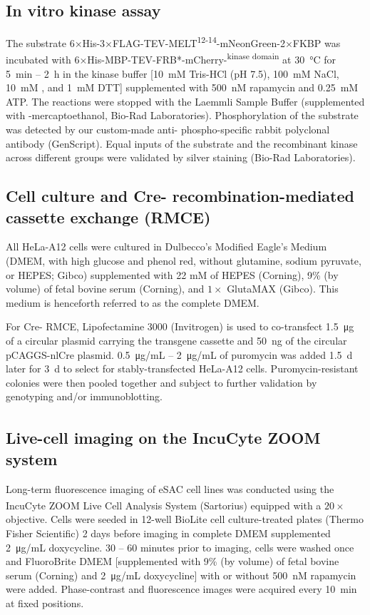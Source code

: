 \subsection{In vitro kinase assay}
The substrate 6×His-3×FLAG-TEV-MELT\textsuperscript{12-14}-mNeonGreen-2×FKBP was incubated with 6×His-MBP-TEV-FRB*-mCherry-\textsuperscript{kinase domain} at \SI{30}{\celsius} for \SI{5}{min} -- \SI{2}{h} in the kinase buffer [\SI{10}{mM} Tris-HCl (pH 7.5), \SI{100}{mM} NaCl, \SI{10}{mM} , and \SI{1}{mM} DTT] supplemented with \SI{500}{nM} rapamycin and \SI{0.25}{mM} ATP. The reactions were stopped with the Laemmli Sample Buffer (supplemented with \textbeta-mercaptoethanol, Bio-Rad Laboratories). Phosphorylation of the substrate was detected by our custom-made anti- phospho-specific rabbit polyclonal antibody (GenScript). Equal inputs of the substrate and the recombinant kinase across different groups were validated by silver staining (Bio-Rad Laboratories).

\subsection{Cell culture and Cre- recombination-mediated cassette exchange (RMCE)}
\label{CellCulture+RMCE_Methods}
All HeLa-A12 cells were cultured in Dulbecco's Modified Eagle's Medium (DMEM, with high glucose and phenol red, without glutamine, sodium pyruvate, or HEPES; Gibco) supplemented with 22 mM of HEPES (Corning), 9\% (by volume) of fetal bovine serum (Corning), and $1\times$ GlutaMAX (Gibco). This medium is henceforth referred to as the complete DMEM.

For Cre- RMCE, Lipofectamine 3000 (Invitrogen) is used to co-transfect \SI{1.5}{\micro g} of a circular plasmid carrying the transgene cassette and \SI{50}{ng} of the circular pCAGGS-nlCre plasmid. \SI{0.5}{\micro g/mL} -- \SI{2}{\micro g/mL} of puromycin was added \SI{1.5}{d} later for \SI{3}{d} to select for stably-transfected HeLa-A12 cells. Puromycin-resistant colonies were then pooled together and subject to further validation by genotyping and/or immunoblotting.

\subsection{Live-cell imaging on the IncuCyte\textsuperscript{\textregistered} ZOOM system}
Long-term fluorescence imaging of eSAC cell lines was conducted using the IncuCyte\textsuperscript{\textregistered} ZOOM Live Cell Analysis System (Sartorius) equipped with a $20\times$ objective. Cells were seeded in 12-well BioLite cell culture-treated plates (Thermo Fisher Scientific) 2 days before imaging in complete DMEM supplemented \SI{2}{\micro g/mL} doxycycline. 30 -- 60 minutes prior to imaging, cells were washed once and FluoroBrite\texttrademark{} DMEM [supplemented with 9\% (by volume) of fetal bovine serum (Corning) and \SI{2}{\micro g/mL} doxycycline] with or without \SI{500}{nM} rapamycin were added. Phase-contrast and fluorescence images were acquired every \SI{10}{min} at fixed positions.%